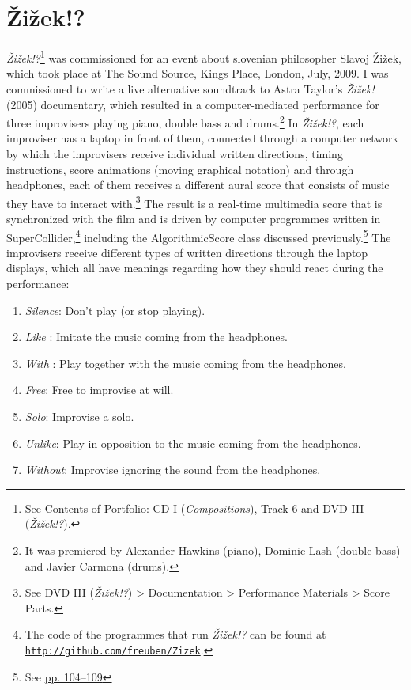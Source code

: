 \section{\v{Z}i\v{z}ek!?}

\emph{\v{Z}i\v{z}ek!?}\footnote{See \hyperlink{portfolio}{Contents of Portfolio}: CD I (\emph{Compositions}), Track 6 and DVD III (\emph{\v{Z}i\v{z}ek!?}).} was commissioned for an event about slovenian philosopher Slavoj \v{Z}i\v{z}ek, which took place at The Sound Source, Kings Place, London, July, 2009. I was commissioned to write a live alternative soundtrack to Astra Taylor's \emph{\v{Z}i\v{z}ek!} (2005) documentary, which resulted in a \mbox{computer-mediated} performance for three improvisers playing piano, double bass and drums.\footnote{It was premiered by Alexander Hawkins (piano), Dominic Lash (double bass) and Javier Carmona (drums).} In \emph{\v{Z}i\v{z}ek!?}, each improviser has a laptop in front of them, connected through a computer network by which the improvisers receive individual written directions, timing instructions, score animations (moving graphical notation) and through headphones, each of them receives a different aural score that consists of music they have to interact with.\footnote{See DVD III (\emph{\v{Z}i\v{z}ek!?}) \tiny \textgreater \footnotesize \hspace{0pt} Documentation \tiny \textgreater \footnotesize \hspace{0pt} Performance Materials \tiny \textgreater \footnotesize \hspace{0pt} Score Parts.} The result is a real-time multimedia score that is synchronized with the film and is driven by computer programmes written in SuperCollider,\footnote{The code of the programmes that run \emph{\v{Z}i\v{z}ek!?} can be found at \href{http://github.com/freuben/Zizek}{\texttt {http://github.com/freuben/Zizek}}.} including the AlgorithmicScore class discussed previously.\footnote{See \hyperlink{algoscore}{pp. 104--109}} The improvisers receive different types of written directions through the laptop displays, which all have meanings regarding how they should react during the performance:
\begin{enumerate}
\item \emph{Silence}: Don't play (or stop playing).
\item \emph{Like} : Imitate the music coming from the headphones.
\item \emph{With} : Play together with the music coming from the headphones.
\item \emph{Free}: Free to improvise at will.
\item \emph{Solo}: Improvise a solo.
\item \emph{Unlike}: Play in opposition to the music coming from the headphones. 
\item \emph{Without}: Improvise ignoring the sound from the headphones.
\end{enumerate}
